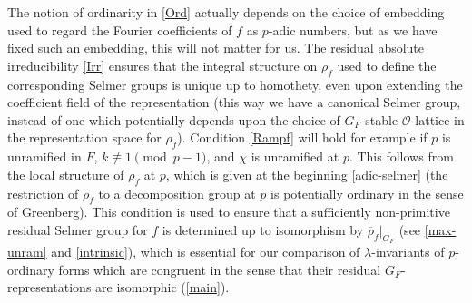 \documentclass[12 pt]{amsart}
\theoremstyle{plain}
\theoremstyle{definition}
\numberwithin{equation}{section}
\numberwithin{table}{section}
\begin{document}
The notion of ordinarity in \cref{Ord} actually depends on the choice of embedding used to regard the Fourier coefficients of $f$ as $p$-adic numbers, but as we have fixed such an embedding, this will not matter for us. The residual absolute irreducibility \cref{Irr} ensures that the integral structure on $\rho_f$ used to define the corresponding Selmer groups is unique up to homothety, even upon extending the coefficient field of the representation (this way we have a canonical Selmer group, instead of one which potentially depends upon the choice of $G_F$-stable $\mathscr{O}$-lattice in the representation space for $\rho_f$). Condition \cref{Rampf} will hold for example if $p$ is unramified in $F$, $k\not\equiv 1\pmod{p-1}$, and $\chi$ is unramified at $p$. This follows from the local structure of $\rho_f$ at $p$, which is given at the beginning \cref{adic-selmer} (the restriction of $\rho_f$ to a decomposition group at $p$ is potentially ordinary in the sense of Greenberg). This condition is used to ensure that a sufficiently non-primitive residual Selmer group for $f$ is determined up to isomorphism by $\overline{\rho}_f\vert_{G_F}$ (see \cref{max-unram} and \cref{intrinsic}), which is essential for our comparison of $\lambda$-invariants of $p$-ordinary forms which are congruent in the sense that their residual $G_F$-representations are isomorphic (\cref{main}).
\end{document}
